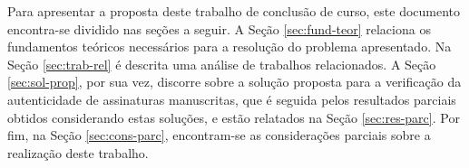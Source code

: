 
Para apresentar a proposta deste trabalho de conclusão de curso, este documento encontra-se dividido nas seções a seguir. A Seção \ref{sec:fund-teor} relaciona os fundamentos teóricos necessários para a resolução do problema apresentado. Na Seção \ref{sec:trab-rel} é descrita uma análise de trabalhos relacionados. A Seção \ref{sec:sol-prop}, por sua vez, discorre sobre a solução proposta para a verificação da autenticidade de assinaturas manuscritas, que é seguida pelos resultados parciais obtidos considerando estas soluções, e estão relatados na Seção \ref{sec:res-parc}. Por fim, na Seção \ref{sec:cons-parc}, encontram-se as considerações parciais sobre a realização deste trabalho.
